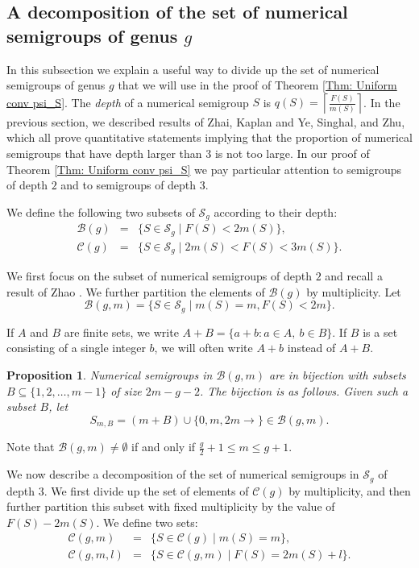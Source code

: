 \documentclass[12pt]{amsart}
\def\B{{\mathcal B}}
\newcommand{\cC}{\mathcal{C}}
\def\SS{{\mathcal S}}
\newtheorem{proposition}[theorem]{Proposition}
\begin{document}
\subsection{A decomposition of the set of numerical semigroups of genus $g$}

In this subsection we explain a useful way to divide up the set of numerical semigroups of genus $g$ that we will use in the proof of Theorem \ref{Thm: Uniform conv psi_S}.  The \emph{depth} of a numerical semigroup $S$ is $q(S)=\left\lceil\frac{F(S)}{m(S)}\right\rceil$.  In the previous section, we described results of Zhai, Kaplan and Ye, Singhal, and Zhu, which all prove quantitative statements implying that the proportion of numerical semigroups that have depth larger than $3$ is not too large.  In our proof of Theorem \ref{Thm: Uniform conv psi_S} we pay particular attention to semigroups of depth $2$ and to semigroups of depth $3$.

We define the following two subsets of $\SS_g$ according to their depth:
\begin{eqnarray*}
\B(g) & = & \{S\in\SS_g \mid F(S)<2m(S)\},\\
\cC(g)& = & \{S\in\SS_g\mid 2m(S)<F(S)<3m(S)\}.
\end{eqnarray*}

We first focus on the subset of numerical semigroups of depth $2$ and recall a result of Zhao \cite{zhao2010constructing}.  We further partition the elements of $\B(g)$ by multiplicity.  Let
\[
\B(g,m)=\{S\in\SS_g\mid m(S)=m,F(S)<2m\}.
\]

If $A$ and $B$ are finite sets, we write $A+B = \{a+b\colon a \in A,\ b \in B\}$.  If $B$ is a set consisting of a single integer $b$, we will often write $A+b$ instead of $A+B$.

\begin{proposition}\cite[Corollary 2.2]{zhao2010constructing}\label{Zhao F<2m}
Numerical semigroups in $\B(g,m)$ are in bijection with subsets $B\subseteq \{1,2,\dots,m-1\}$ of size $2m-g-2$. The bijection is as follows.  Given such a subset $B$, let
\[
S_{m,B}=(m+B)\cup\{0,m,2m\rightarrow\} \in \B(g,m).
\]
\end{proposition}
\noindent Note that $\B(g,m)\neq\emptyset$ if and only if $\frac{g}{2}+1\leq m\leq g+1$.  



We now describe a decomposition of the set of numerical semigroups in $\SS_g$ of depth $3$.  We first divide up the set of elements of $\cC(g)$ by multiplicity, and then further partition this subset with fixed multiplicity by the value of $F(S)-2m(S)$.  We define two sets:
\begin{eqnarray*}
\cC(g,m) & = & \{S\in\cC(g)\mid m(S)=m\},\\
\cC(g,m,l) & = & \{S\in\cC(g,m)\mid F(S)=2m(S)+l\}.
\end{eqnarray*}
\end{document}
